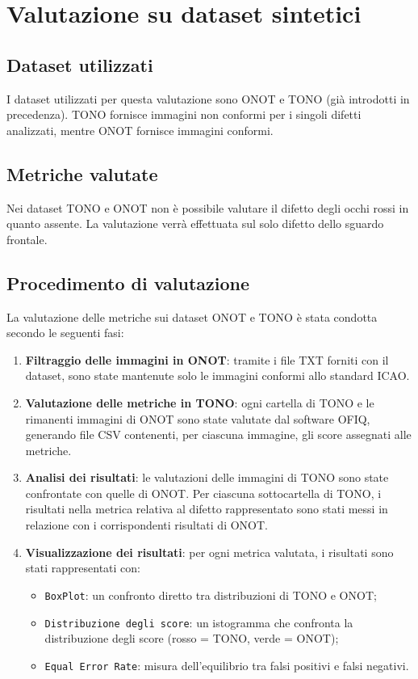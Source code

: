 \documentclass[12pt,a4paper,openright,twoside]{book}
\begin{document}
\section{Valutazione su dataset sintetici}

\subsection{Dataset utilizzati}
I dataset utilizzati per questa valutazione sono ONOT e TONO (già introdotti in precedenza). 
TONO fornisce immagini non conformi per i singoli difetti analizzati, mentre ONOT fornisce immagini conformi.

\subsection{Metriche valutate}
Nei dataset TONO e ONOT non è possibile valutare il difetto degli occhi rossi in quanto assente. 
La valutazione verrà effettuata sul solo difetto dello sguardo frontale.

\subsection{Procedimento di valutazione}
La valutazione delle metriche sui dataset ONOT e TONO è stata condotta secondo le seguenti fasi:
\begin{enumerate}
    \item \textbf{Filtraggio delle immagini in ONOT}: tramite i file TXT forniti con il dataset, sono state mantenute solo le immagini conformi allo standard ICAO.
    \item \textbf{Valutazione delle metriche in TONO}: ogni cartella di TONO e le rimanenti immagini di ONOT sono state valutate dal software OFIQ, generando file CSV contenenti, per ciascuna immagine, gli score assegnati alle metriche.
    \item \textbf{Analisi dei risultati}: le valutazioni delle immagini di TONO sono state confrontate con quelle di ONOT. Per ciascuna sottocartella di TONO, i risultati nella metrica relativa al difetto rappresentato sono stati messi in relazione con i corrispondenti risultati di ONOT.
    \item \textbf{Visualizzazione dei risultati}: per ogni metrica valutata, i risultati sono stati rappresentati con:
    \begin{itemize}
        \item \texttt{BoxPlot}: un confronto diretto tra distribuzioni di TONO e ONOT;
        \item \texttt{Distribuzione degli score}: un istogramma che confronta la distribuzione degli score (rosso = TONO, verde = ONOT);
        \item \texttt{Equal Error Rate}: misura dell'equilibrio tra falsi positivi e falsi negativi.
    \end{itemize}
\end{enumerate}
\end{document}
